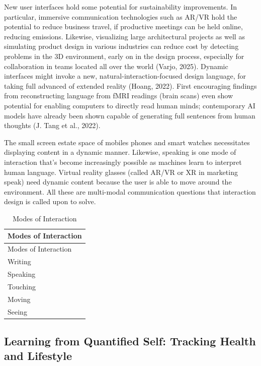 \documentclass[
  12pt,
  letterpaper,
  DIV=11,
  numbers=noendperiod]{scrartcl}
\begin{document}
New user interfaces hold some potential for sustainability improvements.
In particular, immersive communication technologies such as AR/VR hold
the potential to reduce business travel, if productive meetings can be
held online, reducing emissions. Likewise, visualizing large
architectural projects as well as simulating product design in various
industries can reduce cost by detecting problems in the 3D environment,
early on in the design process, especially for collaboration in teams
located all over the world (Varjo, 2025). Dynamic interfaces might
invoke a new, natural-interaction-focused design language, for taking
full advanced of extended reality (Hoang, 2022). First encouraging
findings from reconstructing language from fMRI readings (brain scans)
even show potential for enabling computers to directly read human minds;
contemporary AI models have already been shown capable of generating
full sentences from human thoughts (J. Tang et al., 2022).

The small screen estate space of mobiles phones and smart watches
necessitates displaying content in a dynamic manner. Likewise, speaking
is one mode of interaction that's become increasingly possible as
machines learn to interpret human language. Virtual reality glasses
(called AR/VR or XR in marketing speak) need dynamic content because the
user is able to move around the environment. All these are multi-modal
communication questions that interaction design is called upon to solve.

\def\pandoctableshortcapt{Modes of Interaction}

\begin{longtable}[]{@{}l@{}}
\caption[Modes of Interaction]{Modes of Interaction}\tabularnewline
\toprule\noalign{}
Modes of Interaction \\
\midrule\noalign{}
\endfirsthead
\toprule\noalign{}
Modes of Interaction \\
\midrule\noalign{}
\endhead
\bottomrule\noalign{}
\endlastfoot
Writing \\
Speaking \\
Touching \\
Moving \\
Seeing \\
\end{longtable}

\let\pandoctableshortcapt\relax

\subsection{Learning from Quantified Self: Tracking Health and
Lifestyle}\label{learning-from-quantified-self-tracking-health-and-lifestyle}
\end{document}
